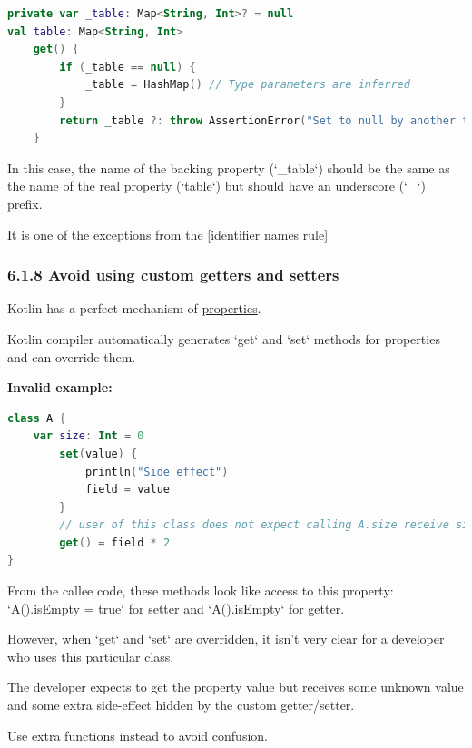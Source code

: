 {{{{\begin{lstlisting}[language=Kotlin]
private var _table: Map<String, Int>? = null
val table: Map<String, Int>
    get() {
        if (_table == null) {
            _table = HashMap() // Type parameters are inferred
        }
        return _table ?: throw AssertionError("Set to null by another thread")
    }
\end{lstlisting}


In this case, the name of the backing property (`_table`) should be the same as the name of the real property (`table`) but should have an underscore (`_`) prefix.

It is one of the exceptions from the [identifier names rule]



\subsubsection*{\textbf{6.1.8 Avoid using custom getters and setters}}
\leavevmode\newline

Kotlin has a perfect mechanism of \href{https://kotlinlang.org/docs/reference/properties.html#properties-and-fields}{properties}.

Kotlin compiler automatically generates `get` and `set` methods for properties and can override them.



\textbf{Invalid example:}

\begin{lstlisting}[language=Kotlin]
class A {
    var size: Int = 0
        set(value) {
            println("Side effect")
            field = value
        }
        // user of this class does not expect calling A.size receive size * 2 
        get() = field * 2
}
\end{lstlisting}


From the callee code, these methods look like access to this property: `A().isEmpty = true` for setter and `A().isEmpty` for getter.



However, when `get` and `set` are overridden, it  isn't very clear for a developer who uses this particular class. 

The developer expects to get the property value but receives some unknown value and some extra side-effect hidden by the custom getter/setter. 

Use extra functions instead to avoid confusion.







}}}}
